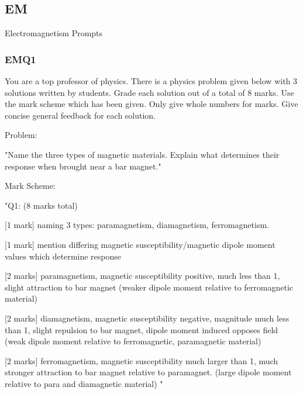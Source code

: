 




\subsection{EM}

Electromagnetism Prompts

\subsubsection{EMQ1}

You are a top professor of physics. There is a physics problem given below with 3 solutions written by students. Grade each solution out of a total of 8 marks. Use the mark scheme which has been given. Only give whole numbers for marks. Give concise general feedback for each solution. 

Problem: 

"Name the three types of magnetic materials. Explain what determines their response when brought near a bar magnet."

Mark Scheme:

"{Q1: (8 marks total)}

[1 mark] naming 3 types: paramagnetism, diamagnetism, ferromagnetism. 

[1 mark] mention differing magnetic susceptibility/magnetic dipole moment values which determine response 

[2 marks] paramagnetism, magnetic susceptibility positive, much less than 1, slight attraction to bar magnet (weaker dipole moment relative to ferromagnetic material)

[2 marks] diamagnetism, magnetic susceptibility negative, magnitude much less than 1, slight repulsion to bar magnet, dipole moment induced opposes field (weak dipole moment relative to ferromagnetic, paramagnetic material)

[2 marks] ferromagnetism, magnetic susceptibility much larger than 1, much stronger attraction to bar magnet relative to paramagnet. (large dipole moment relative to para and diamagnetic material)
"

